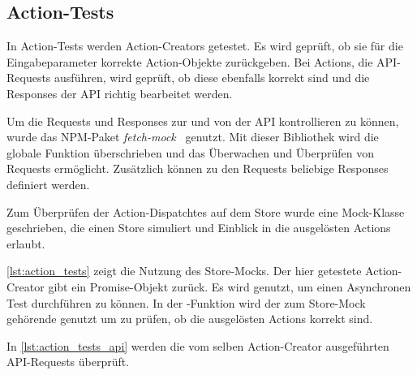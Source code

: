 \subsection{Action-Tests}
\label{sec:tf_action_tests}

In Action-Tests werden Action-Creators getestet.  Es wird geprüft, ob sie für
die Eingabeparameter korrekte Action-Objekte zurückgeben.  Bei Actions, die
API-Requests ausführen, wird geprüft, ob diese ebenfalls korrekt sind und die
Responses der API richtig bearbeitet werden.

Um die Requests und Responses zur und von der API kontrollieren zu können, wurde
das NPM-Paket \emph{fetch-mock}~\cite{fetch-mock} genutzt.  Mit dieser
Bibliothek wird die globale Funktion  überschrieben und das
Überwachen und Überprüfen von Requests ermöglicht.  Zusätzlich können zu den
Requests beliebige Responses definiert werden.

Zum Überprüfen der Action-Dispatchtes auf dem Store wurde eine Mock-Klasse
geschrieben, die einen Store simuliert und Einblick in die ausgelösten Actions
erlaubt.

\cref{lst:action_tests} zeigt die Nutzung des Store-Mocks.  Der hier getestete
Action-Creator  gibt ein Promise-Objekt zurück.  Es wird genutzt, um
einen Asynchronen Test durchführen zu können.  In der -Funktion
wird der zum Store-Mock gehörende  genutzt um zu prüfen,
ob die ausgelösten Actions korrekt sind.



In \cref{lst:action_tests_api} werden die vom selben Action-Creator ausgeführten
API-Requests überprüft.


